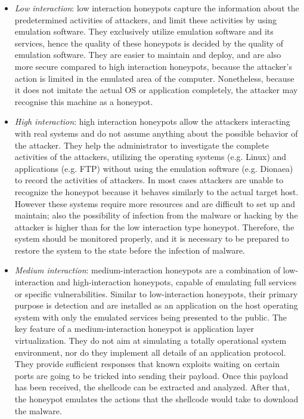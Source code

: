 \documentclass[epsfig,a4paper,11pt,titlepage,oneside,openany]{book}
\begin{document}
\begin{itemize}
\item \textit{Low interaction}: low interaction honeypots capture the information about the predetermined activities of attackers, and limit these activities by using emulation software. They exclusively utilize emulation software and its services, hence the quality of these honeypots is decided by the quality of emulation software. They are easier to maintain and deploy, and are also more secure compared to high interaction honeypots, because the attacker’s action is limited in the emulated area of the computer. Nonetheless, because it does not imitate the actual OS or application completely, the attacker may recognise this machine as a honeypot. 

\item \textit{High interaction}: high interaction honeypots allow the attackers interacting with real systems and do not assume anything about the possible behavior of the attacker. They help the administrator to investigate the complete activities of the attackers, utilizing the operating systems (e.g. Linux) and applications (e.g. FTP) without using the emulation software (e.g. Dionaea) to record the activities of attackers. In most cases attackers are unable to recognize the honeypot because it behaves similarly to the actual target host. However these systems require more resources and are difficult to set up and maintain; also the possibility of infection from the malware or hacking by the attacker is higher than for the low interaction type honeypot. Therefore, the system should be monitored properly, and it is necessary to be prepared to restore the system to the state before the infection of malware.

\item \textit{Medium interaction}: medium-interaction honeypots are a combination of low-interaction and high-interaction honeypots, capable of emulating full services or specific vulnerabilities. Similar to low-interaction honeypots, their primary purpose is detection and are installed as an application on the host operating system with only the emulated services being presented to the public. The key feature of a medium-interaction honeypot is application layer virtualization. They do not aim at simulating a totally operational system environment, nor do they implement all details of an application protocol. They provide sufficient responses that known exploits waiting on certain ports are going to be tricked into sending their payload. Once this payload has been received, the shellcode can be extracted and analyzed. After that, the honeypot emulates the actions that the shellcode would take to download the malware.
 
\end{itemize}
\end{document}
